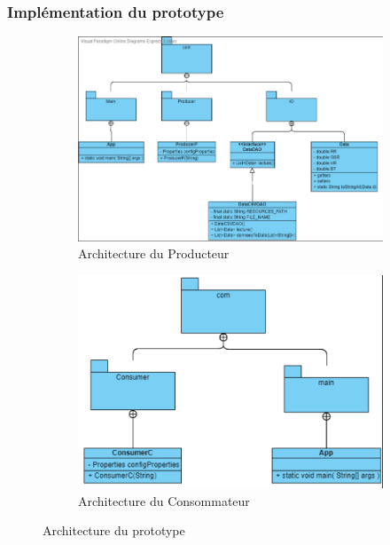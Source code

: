 \documentclass[11pt]{article}
\begin{document}
		\subsubsection{Implémentation du prototype}
			\begin{figure}[p]
				\centering
				\begin{subfigure}{0.5\textwidth}
					\hspace*{-1cm}
					\includegraphics[scale=0.65]{../include/archiProducer.PNG}
					\caption{Architecture du Producteur}
					\label{fig:archiproducer}
				\end{subfigure}\newline
				\begin{subfigure}{0.5\textwidth}
					\includegraphics[scale=0.8]{../include/archiConsumer.PNG}
					\caption{Architecture du Consommateur}
					\label{fig:archiconsumer}
				\end{subfigure}
				\caption{Architecture du prototype}
				\label{fig:archiimp}
			\end{figure}
\end{document}
